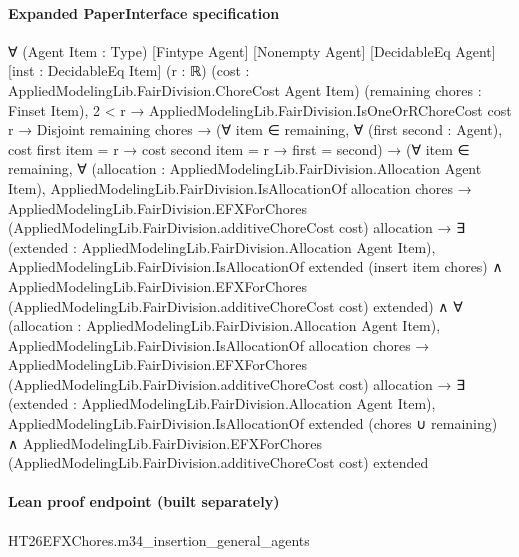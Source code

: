 \documentclass[10pt]{article}
\begin{document}
\paragraph{Expanded PaperInterface specification}
\begin{ReviewVerbatim}
∀ (Agent Item : Type) [Fintype Agent] [Nonempty Agent] [DecidableEq Agent] [inst : DecidableEq Item] (r : ℝ)
  (cost : AppliedModelingLib.FairDivision.ChoreCost Agent Item) (remaining chores : Finset Item),
  2 < r →
    AppliedModelingLib.FairDivision.IsOneOrRChoreCost cost r →
      Disjoint remaining chores →
        (∀ item ∈ remaining, ∀ (first second : Agent), cost first item = r → cost second item = r → first = second) →
          (∀ item ∈ remaining,
              ∀ (allocation : AppliedModelingLib.FairDivision.Allocation Agent Item),
                AppliedModelingLib.FairDivision.IsAllocationOf allocation chores →
                  AppliedModelingLib.FairDivision.EFXForChores (AppliedModelingLib.FairDivision.additiveChoreCost cost)
                      allocation →
                    ∃ (extended : AppliedModelingLib.FairDivision.Allocation Agent Item),
                      AppliedModelingLib.FairDivision.IsAllocationOf extended (insert item chores) ∧
                        AppliedModelingLib.FairDivision.EFXForChores
                          (AppliedModelingLib.FairDivision.additiveChoreCost cost) extended) ∧
            ∀ (allocation : AppliedModelingLib.FairDivision.Allocation Agent Item),
              AppliedModelingLib.FairDivision.IsAllocationOf allocation chores →
                AppliedModelingLib.FairDivision.EFXForChores (AppliedModelingLib.FairDivision.additiveChoreCost cost)
                    allocation →
                  ∃ (extended : AppliedModelingLib.FairDivision.Allocation Agent Item),
                    AppliedModelingLib.FairDivision.IsAllocationOf extended (chores ∪ remaining) ∧
                      AppliedModelingLib.FairDivision.EFXForChores
                        (AppliedModelingLib.FairDivision.additiveChoreCost cost) extended
\end{ReviewVerbatim}



\paragraph{Lean proof endpoint (built separately)}\begin{ReviewVerbatim}
HT26EFXChores.m34_insertion_general_agents
\end{ReviewVerbatim}
\end{document}
